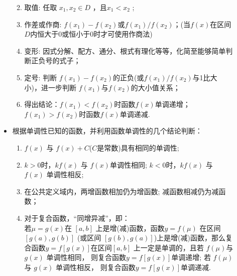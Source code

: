 \begin{description}
\begin{itemize}[leftmargin=*]
        \begin{enumerate}[label=\circled{\arabic*}]
          \kaishu
          \item 取值: 任取 $x_1,x_2\in D$ ，且$x_1<x_2$ ;
          \item 作差或作商: $f(x_1)-f(x_2)$或$f(x_1)/f(x_2)$；(当$f(x)$在区间$D$内恒大于0或恒小于0时才可使用作商法)
          \item 变形: 因式分解、配方、通分、根式有理化等等，化简至能够简单判断正负号的式子； \item 定号: 判断 $f(x_1)-f(x_2)$的正负(或$f(x_1)/f(x_2)$与1比大小)，进一步判断 $f(x_1)$与$f(x_2)$的大小值关系；
          \item 得出结论：$f(x_1)<f(x_2)$时函数$f(x)$单调递增；$f(x_1)>f(x_2)$时函数$f(x)$单调递减.
        \end{enumerate}
      \item 根据单调性已知的函数，并利用函数单调性的几个结论判断：
        \begin{enumerate}[label=\circled{\arabic*}]
          \kaishu
          \item $f(x)$ 与 $f(x)+C$($C$是常数)具有相同的单调性;
          \item $k>0$时，$k f(x)$ 与 $f(x) $单调性相同; $k<0$时，$k f(x)$ 与 $f(x)$ 单调性相反;
          \item 在公共定义域内，两增函数相加仍为增函数; 减函数相减仍为减函数；
          \item 对于复合函数，“同增异减”，即：\\
          若$\mu=g(x)$在 $[a , b]$ 上是增(减)函数，函数$y=f(\mu)$ 在区间 $[g(a) , g(b)]$ (或区间 $[g(b) , g(a)]$)上是增(减)函数，那么复合函数$y=f[g(x)]$在区间$[a , b]$ 上一定是单调的，且若 $f(\mu ) $与 $g(x)$ 单调性相同， 则复合函数$y=f[g(x)]$单调递增; 若 $f(\mu ) $与 $g(x)$ 单调性相反， 则复合函数$y=f[g(x)]$单调递减.
        \end{enumerate}
    \end{itemize}
  \end{description}
  \vspace{5em}
